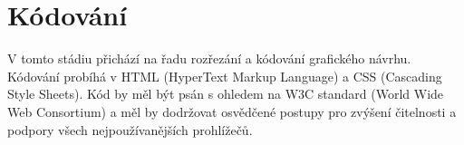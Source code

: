 \section{Kódování}

V tomto stádiu přichází na řadu rozřezání a kódování grafického návrhu. Kódování probíhá v HTML (HyperText Markup Language) a CSS (Cascading Style Sheets). Kód by měl být psán s ohledem na W3C standard (World Wide Web Consortium) a měl by dodržovat osvědčené postupy pro zvýšení čitelnosti a podpory všech nejpoužívanějších prohlížečů.

